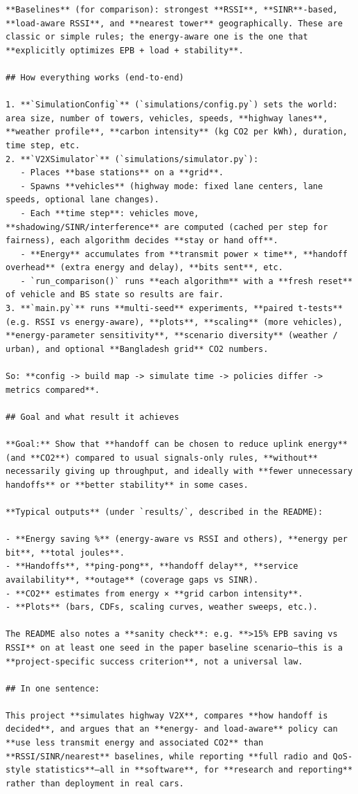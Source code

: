 \documentclass[11pt,a4paper]{article}
\newenvironment{assistantbox}
  {\begin{tcolorbox}[
    breakable,
    colback=AsstBG,
    colframe=AsstBorder,
    title=Project Overview Extract,
    fonttitle=\bfseries\small\color{white},
    coltitle=white,
    colbacktitle=AsstBorder,
    boxrule=0.5pt,
    arc=1.2mm,
    left=1.4mm,right=1.4mm,top=0.8mm,bottom=0.8mm,
    boxsep=0.6mm,
    before skip=0pt,
    after skip=0pt
  ]}
  {\end{tcolorbox}}
\begin{document}
\begin{assistantbox}
\begin{Verbatim}[breaklines=true,breakanywhere=true]
**Baselines** (for comparison): strongest **RSSI**, **SINR**-based, **load-aware RSSI**, and **nearest tower** geographically. These are classic or simple rules; the energy-aware one is the one that **explicitly optimizes EPB + load + stability**.

## How everything works (end-to-end)

1. **`SimulationConfig`** (`simulations/config.py`) sets the world: area size, number of towers, vehicles, speeds, **highway lanes**, **weather profile**, **carbon intensity** (kg CO2 per kWh), duration, time step, etc.
2. **`V2XSimulator`** (`simulations/simulator.py`):
   - Places **base stations** on a **grid**.
   - Spawns **vehicles** (highway mode: fixed lane centers, lane speeds, optional lane changes).
   - Each **time step**: vehicles move, **shadowing/SINR/interference** are computed (cached per step for fairness), each algorithm decides **stay or hand off**.
   - **Energy** accumulates from **transmit power × time**, **handoff overhead** (extra energy and delay), **bits sent**, etc.
   - `run_comparison()` runs **each algorithm** with a **fresh reset** of vehicle and BS state so results are fair.
3. **`main.py`** runs **multi-seed** experiments, **paired t-tests** (e.g. RSSI vs energy-aware), **plots**, **scaling** (more vehicles), **energy-parameter sensitivity**, **scenario diversity** (weather / urban), and optional **Bangladesh grid** CO2 numbers.

So: **config -> build map -> simulate time -> policies differ -> metrics compared**.

## Goal and what result it achieves

**Goal:** Show that **handoff can be chosen to reduce uplink energy** (and **CO2**) compared to usual signals-only rules, **without** necessarily giving up throughput, and ideally with **fewer unnecessary handoffs** or **better stability** in some cases.

**Typical outputs** (under `results/`, described in the README):

- **Energy saving %** (energy-aware vs RSSI and others), **energy per bit**, **total joules**.
- **Handoffs**, **ping-pong**, **handoff delay**, **service availability**, **outage** (coverage gaps vs SINR).
- **CO2** estimates from energy × **grid carbon intensity**.
- **Plots** (bars, CDFs, scaling curves, weather sweeps, etc.).

The README also notes a **sanity check**: e.g. **>15% EPB saving vs RSSI** on at least one seed in the paper baseline scenario—this is a **project-specific success criterion**, not a universal law.

## In one sentence:

This project **simulates highway V2X**, compares **how handoff is decided**, and argues that an **energy- and load-aware** policy can **use less transmit energy and associated CO2** than **RSSI/SINR/nearest** baselines, while reporting **full radio and QoS-style statistics**—all in **software**, for **research and reporting** rather than deployment in real cars.
\end{Verbatim}
\end{assistantbox}
\end{document}
